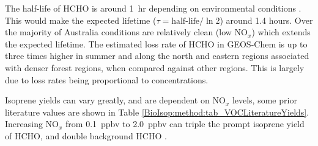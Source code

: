       
      
      The half-life of HCHO %
      is around 1~hr depending on environmental conditions \parencite{WHO_hcho_guidelines_2010}.
      This would make the expected lifetime ($\tau = \text{half-life}/\ln{2}$) around 1.4 hours.
      Over the majority of Australia conditions are relatively clean (low NO$_x$) which extends the expected lifetime.
      The estimated loss rate of HCHO in GEOS-Chem %
      is up to three times higher in summer and along the north and eastern regions associated with denser forest regions, when compared against other regions.
      This is largely due to loss rates being proportional to concentrations.
      
      Isoprene yields can vary greatly, and are dependent on NO$_x$ levels, some prior literature values are shown in Table \ref{BioIsop:method:tab_VOCLiteratureYields}.
      Increasing NO$_x$ from 0.1~ppbv to 2.0~ppbv can triple the prompt isoprene yield of HCHO,  %
      and double background HCHO \parencite{Wolfe2016}.
      
      
